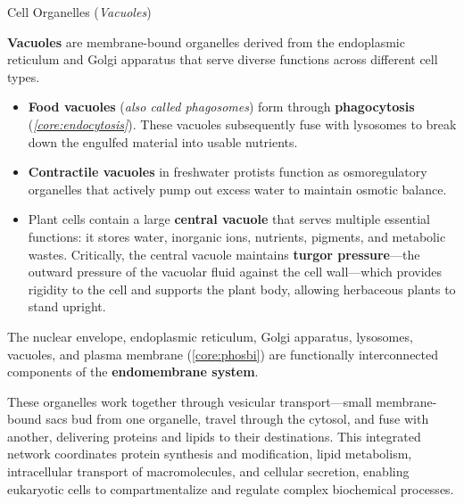 \documentclass[10pt]{article}
\begin{document}
    \begin{core}[label=core:vac]{Cell Organelles (\textit{Vacuoles})}

      \textbf{Vacuoles} are membrane-bound organelles derived from the endoplasmic reticulum and Golgi apparatus that serve diverse functions across different cell types.

      \begin{itemize}

        \item \textbf{Food vacuoles} (\textit{also called phagosomes}) form through \textbf{phagocytosis} (\textit{\autoref{core:endocytosis}}). These vacuoles subsequently fuse with lysosomes to break down the engulfed material into usable nutrients.
        
        \item \textbf{Contractile vacuoles} in freshwater protists function as osmoregulatory organelles that actively pump out excess water to maintain osmotic balance.
        
        \item Plant cells contain a large \textbf{central vacuole} that serves multiple essential functions: it stores water, inorganic ions, nutrients, pigments, and metabolic wastes. Critically, the central vacuole maintains \textbf{turgor pressure}---the outward pressure of the vacuolar fluid against the cell wall---which provides rigidity to the cell and supports the plant body, allowing herbaceous plants to stand upright.

      \end{itemize}


    \end{core}    

    The nuclear envelope, endoplasmic reticulum, Golgi apparatus, lysosomes, vacuoles, and plasma membrane (\autoref{core:phosbi}) are functionally interconnected components of the \textbf{endomembrane system}.

    These organelles work together through vesicular transport---small membrane-bound sacs bud from one organelle, travel through the cytosol, and fuse with another, delivering proteins and lipids to their destinations. This integrated network coordinates protein synthesis and modification, lipid metabolism, intracellular transport of macromolecules, and cellular secretion, enabling eukaryotic cells to compartmentalize and regulate complex biochemical processes.
\end{document}
